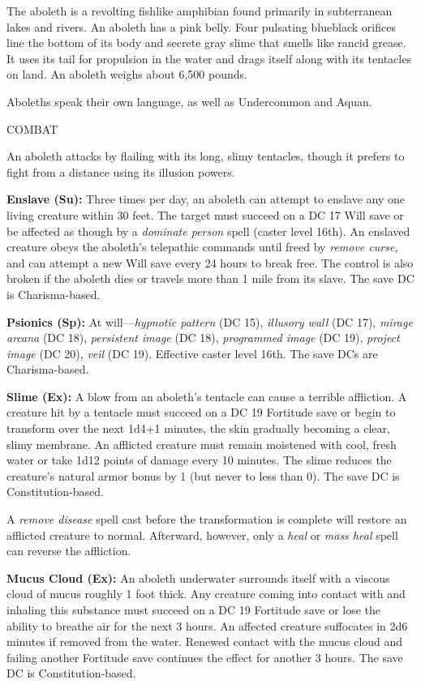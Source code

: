 \documentclass{article}
\begin{document}
The aboleth is a revolting fishlike amphibian found primarily in subterranean lakes 
and rivers. An aboleth has a pink belly. Four pulsating blueblack orifices line 
the bottom of its body and secrete gray slime that smells like rancid grease. It 
uses its tail for propulsion in the water and drags itself along with its tentacles 
on land. An aboleth weighs about 6,500 pounds.

Aboleths speak their own language, as well as Undercommon and Aquan.

COMBAT

An aboleth attacks by flailing with its long, slimy tentacles, though it prefers 
to fight from a distance using its illusion powers.

\textbf{Enslave (Su):} Three times per day, an aboleth can attempt to enslave any 
one living creature within 30 feet. The target must succeed on a DC 17 Will save 
or be affected as though by a \textit{dominate person }spell (caster level 16th). 
An enslaved creature obeys the aboleth's telepathic commands until freed by \textit{remove 
curse, }and can attempt a new Will save every 24 hours to break free. The control 
is also broken if the aboleth dies or travels more than 1 mile from its slave. 
The save DC is Charisma-based.

\textbf{Psionics (Sp):} At will---\textit{hypnotic pattern }(DC 15), \textit{illusory 
wall }(DC 17), \textit{mirage arcana }(DC 18), \textit{persistent image }(DC 18), 
\textit{programmed image }(DC 19), \textit{project image }(DC 20), \textit{veil 
}(DC 19). Effective caster level 16th. The save DCs are Charisma-based.

\textbf{Slime (Ex):} A blow from an aboleth's tentacle can cause a terrible affliction. 
A creature hit by a tentacle must succeed on a DC 19 Fortitude save or begin to 
transform over the next 1d4+1 minutes, the skin gradually becoming a clear, slimy 
membrane. An afflicted creature must remain moistened with cool, fresh water or 
take 1d12 points of damage every 10 minutes. The slime reduces the creature's natural 
armor bonus by 1 (but never to less than 0). The save DC is Constitution-based.

A \textit{remove disease }spell cast before the transformation is complete will 
restore an afflicted creature to normal. Afterward, however, only a \textit{heal 
}or \textit{mass heal }spell can reverse the affliction.

\textbf{Mucus Cloud (Ex):} An aboleth underwater surrounds itself with a viscous 
cloud of mucus roughly 1 foot thick. Any creature coming into contact with and 
inhaling this substance must succeed on a DC 19 Fortitude save or lose the ability 
to breathe air for the next 3 hours. An affected creature suffocates in 2d6 minutes 
if removed from the water. Renewed contact with the mucus cloud and failing another 
Fortitude save continues the effect for another 3 hours. The save DC is Constitution-based.
\end{document}
